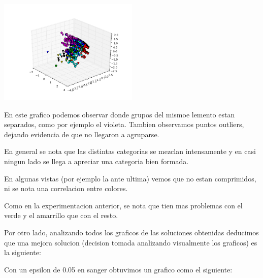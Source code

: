 \includegraphics[width=0.5\textwidth]{img/ej1_oja_01_320}

En este grafico podemos observar donde grupos del mismoe lemento estan separados, como por ejemplo el violeta. Tambien observamos puntos outliers, dejando evidencia de que no llegaron a agruparse. 

En general se nota que las distintas categorias se mezclan intensamente y en casi ningun lado se llega a apreciar una categoria bien formada.

En algunas vistas (por ejemplo la ante ultima) vemos que no estan comprimidos, ni se nota una correlacion entre colores.

Como en la experimentacion anterior, se nota que tien mas problemas con el verde y el amarrillo que con el resto.


Por otro lado, analizando todos los graficos de las soluciones obtenidas deducimos que una mejora solucion (decision tomada analizando visualmente los graficos) es la siguiente:

Con un epsilon de 0.05 en sanger obtuvimos un grafico como el siguiente:


